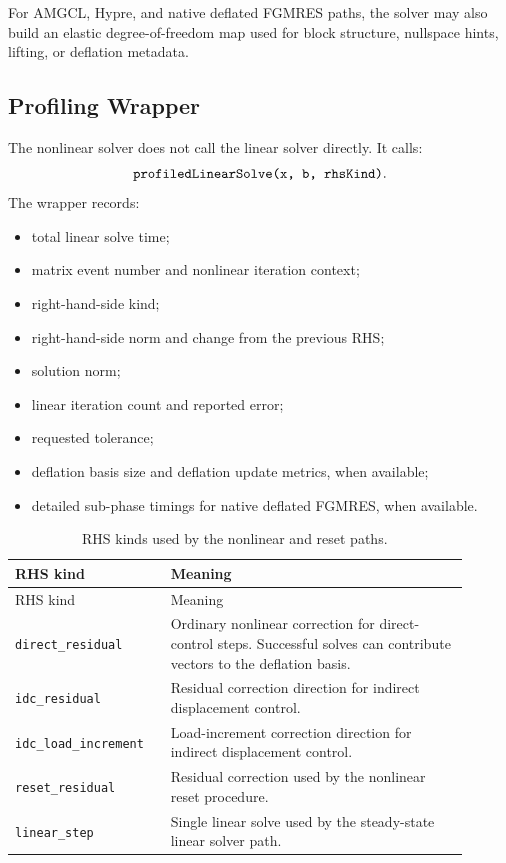 \documentclass[11pt,a4paper]{article}
\newcommand{\code}[1]{\ifmmode\text{\texttt{\detokenize{#1}}}\else\nolinkurl{#1}\fi}
\begin{document}
For AMGCL, Hypre, and native deflated FGMRES paths, the solver may also build an
elastic degree-of-freedom map used for block structure, nullspace hints, lifting,
or deflation metadata.

\subsection{Profiling Wrapper}

The nonlinear solver does not call the linear solver directly.  It calls:
\[
  \code{profiledLinearSolve(x, b, rhsKind)}.
\]
The wrapper records:

\begin{itemize}[leftmargin=2em]
  \item total linear solve time;
  \item matrix event number and nonlinear iteration context;
  \item right-hand-side kind;
  \item right-hand-side norm and change from the previous RHS;
  \item solution norm;
  \item linear iteration count and reported error;
  \item requested tolerance;
  \item deflation basis size and deflation update metrics, when available;
  \item detailed sub-phase timings for native deflated FGMRES, when available.
\end{itemize}

\begin{longtable}{p{0.30\linewidth} p{0.60\linewidth}}
\caption{RHS kinds used by the nonlinear and reset paths.}
\label{tab:rhs-kinds}\\
\toprule
RHS kind & Meaning \\
\midrule
\endfirsthead
\toprule
RHS kind & Meaning \\
\midrule
\endhead
\code{direct_residual} &
Ordinary nonlinear correction for direct-control steps.  Successful solves can
contribute vectors to the deflation basis. \\

\code{idc_residual} &
Residual correction direction for indirect displacement control. \\

\code{idc_load_increment} &
Load-increment correction direction for indirect displacement control. \\

\code{reset_residual} &
Residual correction used by the nonlinear reset procedure. \\

\code{linear_step} &
Single linear solve used by the steady-state linear solver path. \\
\bottomrule
\end{longtable}
\end{document}
